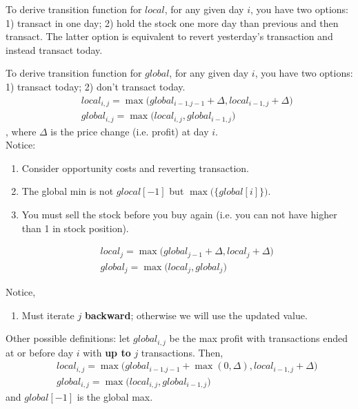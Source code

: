 {To derive transition function for $local$, for any given day $i$, you have two options: 1) transact in one day; 2) hold the stock one more day than previous and then transact. The latter option is equivalent to revert yesterday's transaction and instead transact today. 

To derive transition function for $global$, for any given day $i$, you have two options: 1) transact today; 2) don't transact today. 
\begin{eqnarray*}
&& local_{i,j} = \max\Big(global_{i-1.j-1}+\Delta, local_{i-1,j}+\Delta\Big) \nonumber \\
&& global_{i,j} = \max\Big(local_{i, j}, global_{i-1,j}\Big)
\end{eqnarray*}
, where $\Delta$ is the price change (i.e. profit) at day $i$.\\
Notice:
\begin{enumerate}
\item Consider opportunity costs and reverting transaction.
\item The global min is not $glocal[-1]$ but $\max\big(\{global[i]\}\big)$.
\item You must sell the stock before you buy again (i.e. you can not have higher than 1 in stock position). 
\end{enumerate}

\begin{eqnarray*}
&& local_{j} = \max\Big(global_{j-1} + \Delta, local_{j}+\Delta\Big)
\nonumber \\
&& global_{j} = \max\Big(local_{j}, global_{j}\Big)
\end{eqnarray*}

Notice,
\begin{enumerate}
\item Must iterate $j$ \textbf{backward}; otherwise we will use the updated value. 
\end{enumerate}

Other possible definitions: let $global_{i, j}$ be the max profit
with transactions ended at or before day $i$ with \textbf{up to} $j$ transactions. Then, 
\begin{eqnarray*}
&& local_{i,j} = \max\Big(global_{i-1.j-1} + \max(0, \Delta), local_{i-1,j}+\Delta\Big)
\nonumber \\
&& global_{i,j} = \max\Big(local_{i, j}, global_{i-1,j}\Big)
\end{eqnarray*}
and $global[-1]$ is the global max. 

}

